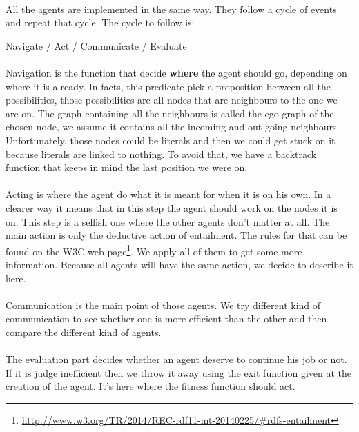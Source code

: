 \documentclass{article}
\begin{document}
	\paragraph{}
	All the agents are implemented in the same way.
	They follow a cycle of events and repeat that cycle.
	The cycle to follow is:
	\begin{center}
	Navigate / Act / Communicate / Evaluate
	\end{center}
	\paragraph{}
	Navigation is the function that decide \textbf{where} the agent should go, depending on where it is already.
	In facts, this predicate pick a proposition between all the possibilities,
	those possibilities are all nodes that are neighbours to the one we are on.
	The graph containing all the neighbours is called the ego-graph of the chosen node,
	we assume it contains all the incoming and out going neighbours.
	Unfortunately, those nodes could be literals and then we could get stuck on it because literals are linked to nothing.
	To avoid that, we have a backtrack function that keeps in mind the last position we were on.
	\paragraph{}
	Acting is where the agent do what it is meant for when it is on his own.
	In a clearer way it means that in this step the agent should work on the nodes it is on.
	This step is a selfish one where the other agents don't matter at all.
	The main action is only the deductive action of entailment.
	The rules for that can be found on the W3C web page\footnote{ \url{http://www.w3.org/TR/2014/REC-rdf11-mt-20140225/\#rdfs-entailment}}.
	We apply all of them to get some more information.
	Because all agents will have the same action, we decide to describe it here.
	\paragraph{}
	Communication is the main point of those agents.
	We try different kind of communication to see whether one is more efficient than the other
	and then compare the different kind of agents.
	\paragraph{}
	The evaluation part decides whether an agent deserve to continue his job or not.
	If it is judge inefficient then we throw it away using the exit function given at the creation of the agent.
	It's here where the fitness function should act.
\end{document}
